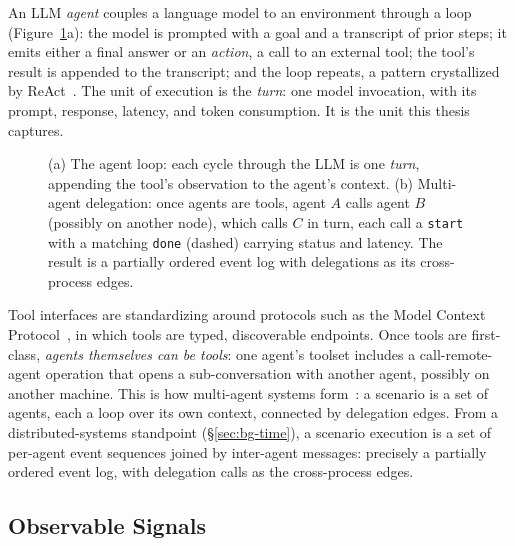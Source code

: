 An LLM \emph{agent} couples a language model to an
environment through a loop (Figure~\ref{fig:agentloop}a): the model is
prompted with a goal and a transcript of prior steps; it emits either a
final answer or an \emph{action}, a call to an external tool; the tool's
result is appended to the transcript; and the loop repeats, a pattern
crystallized by ReAct~\cite{yao2023react}. The unit of execution is the
\emph{turn}: one model invocation, with its prompt, response, latency, and
token consumption. It is the unit this thesis captures.

\begin{figure}[t]
  \centering
  
  \caption[The agent loop and multi-agent delegation]{(a) The agent loop: each cycle through the LLM is one
  \emph{turn}, appending the tool's observation to the agent's context.
  (b) Multi-agent delegation: once agents are tools, agent $A$ calls agent
  $B$ (possibly on another node), which calls $C$ in turn, each call a
  \texttt{start} with a matching \texttt{done} (dashed) carrying status and
  latency. The result is a partially ordered event log with delegations as
  its cross-process edges.}
  \label{fig:agentloop}
\end{figure}

Tool interfaces are standardizing around protocols such as the Model Context
Protocol~\cite{anthropic2024mcp}, in which tools are typed, discoverable
endpoints. Once tools are first-class, \emph{agents themselves can be tools}:
one agent's toolset includes a call-remote-agent operation that opens a
sub-conversation with another agent, possibly on another machine. This is
how multi-agent systems form~\cite{wu2023autogen}: a
scenario is a set of agents, each a loop over its own context, connected by
delegation edges. From a distributed-systems standpoint
(\S\ref{sec:bg-time}), a scenario execution is a set of per-agent event
sequences joined by inter-agent messages: precisely a partially ordered
event log, with delegation calls as the cross-process edges.

\subsection{Observable Signals}
\label{sec:bg-agent-signals}

